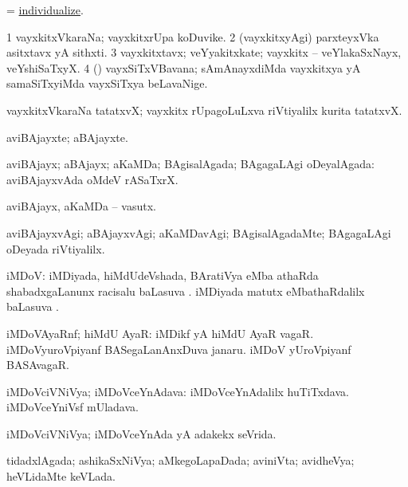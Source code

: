 \bentry
{}
\gl{\sakirx}
\bmng
 = \hyperlink{individualize}{individualize}. 
\emng
\eentry

\bentry
{}
\gl{\nA}
\bmng
\bnum
\num{1} vayxkitxVkaraNa; vayxkitxrUpa koDuvike. 
\num{2} (vayxkitxyAgi) parxteyxVka asitxtavx yA sithxti. 
\num{3} vayxkitxtavx; veYyakitxkate; vayxkitx -- veYlakaSxNayx, veYshiSaTxyX. 
\num{4} (\tashA) vayxSiTxVBavana; sAmAnayxdiMda vayxkitxya yA samaSiTxyiMda vayxSiTxya beLavaNige. 
\enum
\emng

\noindent
\gl{\pagu}
\bmng
{} vayxkitxVkaraNa tatatxvX; vayxkitx rUpagoLuLxva riVtiyalilx kurita tatatxvX. 
\emng
\eentry

\bentry
{}
\gl{\nA}
\bmng
aviBAjayxte; aBAjayxte. 
\emng
\eentry

\bentry
{}
\gl{\gu}
\bmng
aviBAjayx; aBAjayx; aKaMDa; BAgisalAgada; BAgagaLAgi oDeyalAgada:  aviBAjayxvAda oMdeV rASaTxrX. 
\emng
\eentry

\bentry
{}
\gl{\nA}
\bmng
aviBAjayx, aKaMDa -- vasutx. 
\emng
\eentry

\bentry
{}
\gl{\kirxvi}
\bmng
aviBAjayxvAgi; aBAjayxvAgi; aKaMDavAgi; BAgisalAgadaMte; BAgagaLAgi oDeyada riVtiyalilx. 
\emng
\eentry

\bentry
{}
\gl{\sapUpa}
\bmng
iMDoV: 
\banum
{} iMDiyada, hiMdUdeVshada, BAratiVya eMba athaRda shabadxgaLanunx racisalu baLasuva \sapUpa. 
 iMDiyada matutx eMbathaRdalilx baLasuva \sapUpa. 
\eanum
\emng
\eentry

\bentry
{}
\gl{\nA}
\bmng
iMDoVAyaRnf; hiMdU AyaR: 
\banum
{} iMDikf yA hiMdU AyaR vagaR. 
 iMDoVyuroVpiyanf BASegaLanAnxDuva janaru. 
 iMDoV yUroVpiyanf BASAvagaR. 
\eanum
\emng
\eentry

\bentry
{}
\gl{\nA}
\bmng
iMDoVciVNiVya; iMDoVceYnAdava: 
\banum
{} iMDoVceYnAdalilx huTiTxdava. 
 iMDoVceYniVsf mUladava. 
\eanum
\emng
\eentry

\bentry
{}
\gl{\gu}
\bmng
iMDoVciVNiVya; iMDoVceYnAda yA adakekx seVrida. 
\emng
\eentry

\bentry
{}
\gl{\gu}
\bmng
tidadxlAgada; ashikaSxNiVya; aMkegoLapaDada; aviniVta; avidheVya; heVLidaMte keVLada. 
\emng
\eentry

